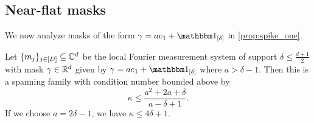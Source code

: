 \subsection{Near-flat masks}
\label{sec:nearflat_mask}
We now analyze masks of the form $\gamma = a e_1 + \one_{[\delta]}$ in \cref{prop:spike_one}.

\begin{proposition}
  Let $\{m_j\}_{j \in [D]} \subseteq \mathbb{C}^d$ be the local Fourier measurement system of support $\delta \le \frac{d + 1}{2}$ with mask $\gamma \in \mathbb{R}^d$ given by $\gamma = a e_1 + \one_{[\delta]}$ where $a > \delta - 1$.  Then this is a spanning family with condition number bounded above by \begin{equation} \kappa \le \dfrac{a^2 + 2 a + \delta}{a - \delta + 1}. \label{eq:spike_cond} \end{equation}  If we choose $a = 2 \delta - 1$, we have $\kappa \le 4 \delta + 1$.
  \label{prop:spike_one}
\end{proposition}

